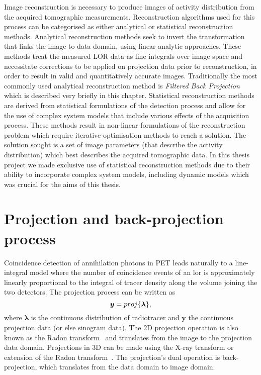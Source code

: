 Image reconstruction is necessary to produce images of activity distribution from the acquired tomographic measurements. Reconstruction algorithms used for this process can be categorised as either analytical or statistical reconstruction methods.  
Analytical reconstruction methods seek to invert the transformation that links the image to data domain, using linear analytic approaches. These methods treat the measured LOR data as line integrals over image space and necessitate corrections to be applied on projection data prior to reconstruction, in order to result in valid and quantitatively accurate images. Traditionally the most commonly used analytical reconstruction method is \textit{Filtered Back Projection} which is described very briefly in this chapter. 
Statistical reconstruction methods are derived from statistical formulations of the detection process and allow for the use of complex system models that include various effects of the acquisition process. These methods result in non-linear formulations of the reconstruction problem which require iterative optimisation methods to reach a solution. The solution sought is a set of image parameters (that describe the activity distribution) which best describes the acquired tomographic data. 
In this thesis project we made exclusive use of statistical reconstruction methods due to their ability to incorporate complex system models, including dynamic models which was crucial for the aims of this thesis.

\section{Projection and back-projection process}
Coincidence detection of annihilation photons in PET leads naturally to a line-integral model where the number of coincidence events of an \gls{lor} is approximately linearly proportional to the integral of tracer density along the volume joining the two detectors. 
The projection process can be written as
\begin{equation}
   \bm y = proj\{\bm{\lambda}\}  \\, 
  \label{eqn:Radon}
\end{equation}
where $\bm{\lambda}$ is the continuous distribution of radiotracer and $\bm{y}$ the continuous projection data (or else sinogram data).
The 2D projection operation is also known as the Radon transform~\cite{radon1917,Radon1986} and translates from the image to the projection data domain. Projections in 3D can be made using the X-ray transform or extension of the Radon transform~\cite{Natterer1986}. 
The projection's dual operation is back-projection, which translates from the data domain to image domain.
%
